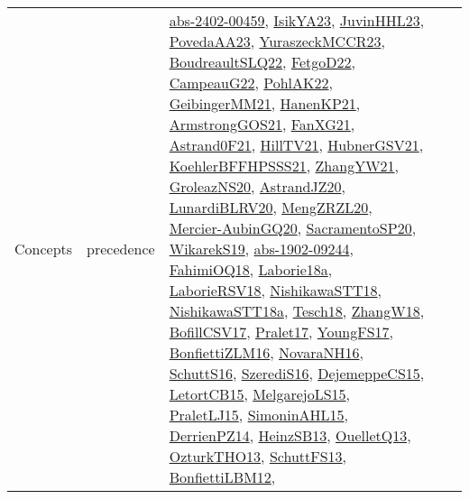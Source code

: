 {\begin{longtable}{lp{3cm}>{\raggedright}p{6cm}>{\raggedright}p{6cm}p{8cm}}
Concepts & precedence & \href{articles/abs-2402-00459.pdf}{abs-2402-00459}\cite{abs-2402-00459}, \href{articles/IsikYA23.pdf}{IsikYA23}\cite{IsikYA23}, \href{papers/JuvinHHL23.pdf}{JuvinHHL23}\cite{JuvinHHL23}, \href{papers/PovedaAA23.pdf}{PovedaAA23}\cite{PovedaAA23}, \href{articles/YuraszeckMCCR23.pdf}{YuraszeckMCCR23}\cite{YuraszeckMCCR23}, \href{papers/BoudreaultSLQ22.pdf}{BoudreaultSLQ22}\cite{BoudreaultSLQ22}, \href{articles/FetgoD22.pdf}{FetgoD22}\cite{FetgoD22}, \href{articles/CampeauG22.pdf}{CampeauG22}\cite{CampeauG22}, \href{articles/PohlAK22.pdf}{PohlAK22}\cite{PohlAK22}, \href{papers/GeibingerMM21.pdf}{GeibingerMM21}\cite{GeibingerMM21}, \href{papers/HanenKP21.pdf}{HanenKP21}\cite{HanenKP21}, \href{papers/ArmstrongGOS21.pdf}{ArmstrongGOS21}\cite{ArmstrongGOS21}, \href{articles/FanXG21.pdf}{FanXG21}\cite{FanXG21}, \href{papers/Astrand0F21.pdf}{Astrand0F21}\cite{Astrand0F21}, \href{papers/HillTV21.pdf}{HillTV21}\cite{HillTV21}, \href{articles/HubnerGSV21.pdf}{HubnerGSV21}\cite{HubnerGSV21}, \href{articles/KoehlerBFFHPSSS21.pdf}{KoehlerBFFHPSSS21}\cite{KoehlerBFFHPSSS21}, \href{articles/ZhangYW21.pdf}{ZhangYW21}\cite{ZhangYW21}, \href{papers/GroleazNS20.pdf}{GroleazNS20}\cite{GroleazNS20}, \href{articles/AstrandJZ20.pdf}{AstrandJZ20}\cite{AstrandJZ20}, \href{articles/LunardiBLRV20.pdf}{LunardiBLRV20}\cite{LunardiBLRV20}, \href{articles/MengZRZL20.pdf}{MengZRZL20}\cite{MengZRZL20}, \href{papers/Mercier-AubinGQ20.pdf}{Mercier-AubinGQ20}\cite{Mercier-AubinGQ20}, \href{articles/SacramentoSP20.pdf}{SacramentoSP20}\cite{SacramentoSP20}, \href{articles/WikarekS19.pdf}{WikarekS19}\cite{WikarekS19}, \href{articles/abs-1902-09244.pdf}{abs-1902-09244}\cite{abs-1902-09244}, \href{articles/FahimiOQ18.pdf}{FahimiOQ18}\cite{FahimiOQ18}, \href{papers/Laborie18a.pdf}{Laborie18a}\cite{Laborie18a}, \href{articles/LaborieRSV18.pdf}{LaborieRSV18}\cite{LaborieRSV18}, \href{papers/NishikawaSTT18.pdf}{NishikawaSTT18}\cite{NishikawaSTT18}, \href{papers/NishikawaSTT18a.pdf}{NishikawaSTT18a}\cite{NishikawaSTT18a}, \href{papers/Tesch18.pdf}{Tesch18}\cite{Tesch18}, \href{articles/ZhangW18.pdf}{ZhangW18}\cite{ZhangW18}, \href{papers/BofillCSV17.pdf}{BofillCSV17}\cite{BofillCSV17}, \href{papers/Pralet17.pdf}{Pralet17}\cite{Pralet17}, \href{papers/YoungFS17.pdf}{YoungFS17}\cite{YoungFS17}, \href{papers/BonfiettiZLM16.pdf}{BonfiettiZLM16}\cite{BonfiettiZLM16}, \href{articles/NovaraNH16.pdf}{NovaraNH16}\cite{NovaraNH16}, \href{papers/SchuttS16.pdf}{SchuttS16}\cite{SchuttS16}, \href{papers/SzerediS16.pdf}{SzerediS16}\cite{SzerediS16}, \href{papers/DejemeppeCS15.pdf}{DejemeppeCS15}\cite{DejemeppeCS15}, \href{articles/LetortCB15.pdf}{LetortCB15}\cite{LetortCB15}, \href{papers/MelgarejoLS15.pdf}{MelgarejoLS15}\cite{MelgarejoLS15}, \href{papers/PraletLJ15.pdf}{PraletLJ15}\cite{PraletLJ15}, \href{articles/SimoninAHL15.pdf}{SimoninAHL15}\cite{SimoninAHL15}, \href{papers/DerrienPZ14.pdf}{DerrienPZ14}\cite{DerrienPZ14}, \href{articles/HeinzSB13.pdf}{HeinzSB13}\cite{HeinzSB13}, \href{papers/OuelletQ13.pdf}{OuelletQ13}\cite{OuelletQ13}, \href{articles/OzturkTHO13.pdf}{OzturkTHO13}\cite{OzturkTHO13}, \href{papers/SchuttFS13.pdf}{SchuttFS13}\cite{SchuttFS13}, \href{papers/BonfiettiLBM12.pdf}{BonfiettiLBM12}\cite{BonfiettiLBM12}, 
\end{longtable}}
